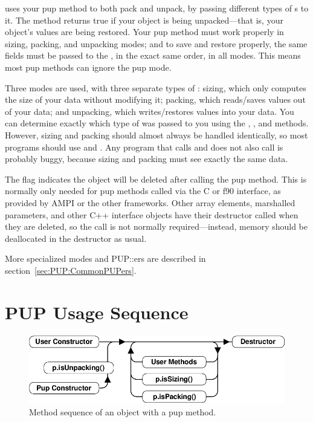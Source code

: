 \charmpp{} uses your pup method to both pack and unpack, 
by passing different types of s to it.  The method
 returns true if your object is being unpacked---that 
is, your object's values are being restored.  Your pup method must
work properly in sizing, packing, and unpacking modes; and
to save and restore properly, the same fields must be passed 
to the , in the exact same order, in all modes.
This means most pup methods can ignore the pup mode.

Three modes are used, with three separate types of : 
sizing, which only computes the size of your data without modifying it;
packing, which reads/saves values out of your data; and unpacking,
which writes/restores values into your data.  You can determine
exactly which type of  was passed to you using the
, , and 
methods. However, sizing and packing should almost always be 
handled identically, so most programs should use 
and .  Any program that calls  
and does not also call  is probably buggy, because
sizing and packing must see exactly the same data.


The  flag indicates the object will be deleted
after calling the pup method.  This is normally only needed for
pup methods called via the C or f90 interface, as provided by 
AMPI or the other frameworks.  Other \charmpp{} array elements, 
marshalled parameters, and other C++ interface objects 
have their destructor called when they are deleted, so the 
 call is not normally required---instead,
memory should be deallocated in the destructor as usual.

More specialized modes and PUP::ers are described in section~\ref{sec:PUP:CommonPUPers}. 


\section{PUP Usage Sequence}

\label{sec:lifecycle}

\begin{figure}[h]
\begin{center}
\includegraphics[width=6.0in]{fig/pup}
\end{center}
\caption{Method sequence of an object with a pup method.}
\label{fig:pup}
\end{figure}

